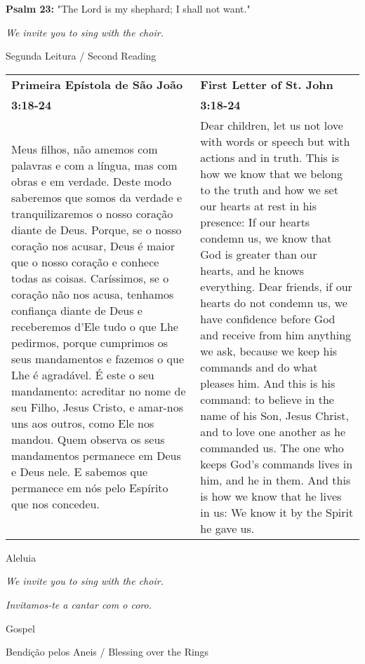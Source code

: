{\bf Psalm 23:} "The Lord is my shephard; I shall not want."

{\it We invite you to sing with the choir.}

\newpage
{\large Segunda Leitura / Second Reading}

\begin{longtable}{p{2in}p{2in}}
  {\bf Primeira Epístola de São João} & \hfill{\bf First Letter of St. John}\\
  {\bf 3:18-24}&\hfill{\bf 3:18-24}\\
Meus filhos,
não amemos com palavras e com a língua,
mas com obras e em verdade.
Deste modo saberemos que somos da verdade
e tranquilizaremos o nosso coração diante de Deus.
Porque, se o nosso coração nos acusar,
Deus é maior que o nosso coração
e conhece todas as coisas.
Caríssimos, se o coração não nos acusa,
tenhamos confiança diante de Deus
e receberemos d’Ele tudo o que Lhe pedirmos,
porque cumprimos os seus mandamentos
e fazemos o que Lhe é agradável.
É este o seu mandamento:
acreditar no nome de seu Filho, Jesus Cristo,
e amar-nos uns aos outros, como Ele nos mandou.
Quem observa os seus mandamentos
permanece em Deus e Deus nele.
E sabemos que permanece em nós
pelo Espírito que nos concedeu.
&
Dear children, let us not love with words or speech but with actions and in truth.
This is how we know that we belong to the truth and how we set our hearts at rest in his presence: If our hearts condemn us, we know that God is greater than our hearts, and he knows everything. Dear friends, if our hearts do not condemn us, we have confidence before God and receive from him anything we ask, because we keep his commands and do what pleases him. And this is his command: to believe in the name of his Son, Jesus Christ, and to love one another as he commanded us. The one who keeps God’s commands lives in him, and he in them. And this is how we know that he lives in us: We know it by the Spirit he gave us.
\end{longtable}

{\large Aleluia}

{\it We invite you to sing with the choir.}

{\it Invitamos-te a cantar com o coro.}

\vspace{20pt}

{\large Gospel}

\vspace{20pt}

{\large Bendição pelos Aneis / Blessing over the Rings}


